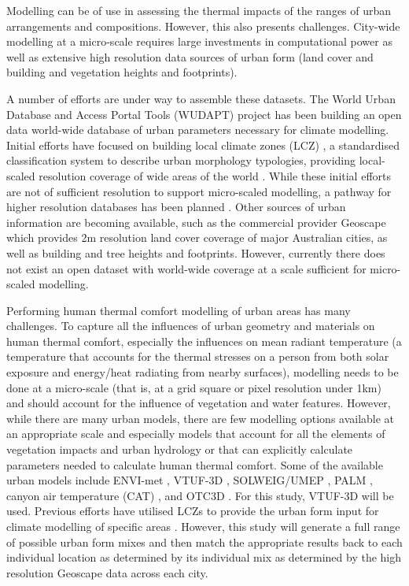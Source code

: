 \documentclass[final,3p,times,authoryear]{elsarticle}
\begin{document}
Modelling can be of use in assessing the thermal impacts of the ranges of urban arrangements and compositions. However, this also presents challenges. City-wide modelling at a micro-scale requires large investments in computational power as well as extensive high resolution data sources of urban form (land cover and building and vegetation heights and footprints). 

A number of efforts are under way to assemble these datasets. The World Urban Database and Access Portal Tools (WUDAPT) project \citep{Ching2018a} has been building an open data world-wide database of urban parameters necessary for climate modelling. Initial efforts have focused on building local climate zones (LCZ) \citep{Stewart2012b}, a standardised classification system to describe urban morphology typologies, providing local-scaled resolution coverage of wide areas of the world \citep{Demuzere2019}. While these initial efforts are not of sufficient resolution to support micro-scaled modelling, a pathway for higher resolution databases has been planned \citep{Ching2019}. Other sources of urban information are becoming available, such as the commercial provider Geoscape \citep{Geoscape2020} which provides 2m resolution land cover coverage of major Australian cities, as well as building and tree heights and footprints. However, currently there does not exist an open dataset with world-wide coverage at a scale sufficient for micro-scaled modelling.

Performing human thermal comfort modelling of urban areas has many challenges. To capture all the influences of urban geometry and materials on human thermal comfort, especially the influences on mean radiant temperature \citep{Kantor2011} (a temperature that accounts for the thermal stresses on a person from both solar exposure and energy/heat radiating from nearby surfaces), modelling needs to be done at a micro-scale (that is, at a grid square or pixel resolution under 1km) and should account for the influence of vegetation and water features. However, while there are many urban models, there are few modelling options available at an appropriate scale and especially models that account for all the elements of vegetation impacts and urban hydrology or that can explicitly calculate parameters needed to calculate human thermal comfort. Some of the available urban models include ENVI-met \citep{Bruse1999}, VTUF-3D \citep{Nice2018a}, SOLWEIG/UMEP \citep{Lindberg2018}, PALM \citep{Dominik2019}, canyon air temperature (CAT) \citep{Erell2006}, and OTC3D \citep{Nazarian2018}. For this study, VTUF-3D will be used. Previous efforts have utilised LCZs to provide the urban form input for climate modelling of specific areas \citep{stewart2014eval,Verdonck2018,Hammerberg2018,Masson2020,Emery2021}. However, this study will generate a full range of possible urban form mixes and then match the appropriate results back to each individual location as determined by its individual mix as determined by the high resolution Geoscape data across each city. 
\end{document}

